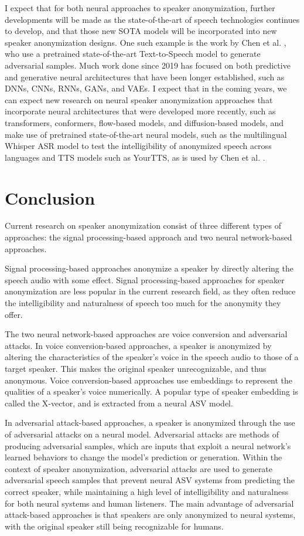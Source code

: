\documentclass{Interspeech2024}
\begin{document}
I expect that for both neural approaches to speaker anonymization, further developments will be made as the state-of-the-art of speech technologies continues to develop, and that those new SOTA models will be incorporated into new speaker anonymization designs.
One such example is the work by Chen et al. \cite{chen_2024_adversarial_yourtts}, who use a pretrained state-of-the-art Text-to-Speech model to generate adversarial samples.
Much work done since 2019 has focused on both predictive and generative neural architectures that have been longer established, such as DNNs, CNNs, RNNs, GANs, and VAEs.
I expect that in the coming years, we can expect new research on neural speaker anonymization approaches that incorporate neural architectures that were developed more recently, such as transformers, conformers, flow-based models, and diffusion-based models, and make use of pretrained state-of-the-art neural models, such as the multilingual Whisper ASR model to test the intelligibility of anonymized speech across languages and TTS models such as YourTTS, as is used by Chen et al. \cite{chen_2024_adversarial_yourtts}.


\section{Conclusion}
Current research on speaker anonymization consist of three different types of approaches: the signal processing-based approach and two neural network-based approaches.

Signal processing-based approaches anonymize a speaker by directly altering the speech audio with some effect.
Signal processing-based approaches for speaker anonymization are less popular in the current research field, as they often reduce the intelligibility and naturalness of speech too much for the anonymity they offer.

The two neural network-based approaches are voice conversion and adversarial attacks.
In voice conversion-based approaches, a speaker is anonymized by altering the characteristics of the speaker's voice in the speech audio to those of a target speaker.
This makes the original speaker unrecognizable, and thus anonymous.
Voice conversion-based approaches use embeddings to represent the qualities of a speaker's voice numerically.
A popular type of speaker embedding is called the X-vector, and is extracted from a neural ASV model.

In adversarial attack-based approaches, a speaker is anonymized through the use of adversarial attacks on a neural model.
Adversarial attacks are methods of producing adversarial samples, which are inputs that exploit a neural network's learned behaviors to change the model's prediction or generation.
Within the context of speaker anonymization, adversarial attacks are used to generate adversarial speech samples that prevent neural ASV systems from predicting the correct speaker, while maintaining a high level of intelligibility and naturalness for both neural systems and human listeners.
The main advantage of adversarial attack-based approaches is that speakers are only anonymized to neural systems, with the original speaker still being recognizable for humans.
\end{document}
